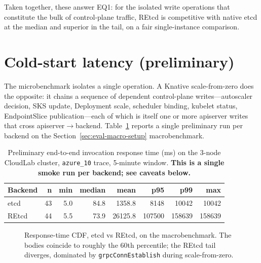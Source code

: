 Taken together, these answer EQ1: for the isolated write operations that constitute the bulk of control-plane traffic, REtcd is competitive with native etcd at the median and superior in the tail, on a fair single-instance comparison.

\section{Cold-start latency (preliminary)}
\label{sec:eval-coldstart}

The microbenchmark isolates a single operation. A Knative scale-from-zero does the opposite: it chains a sequence of dependent control-plane writes---autoscaler decision, SKS update, Deployment scale, scheduler binding, kubelet status, EndpointSlice publication---each of which is itself one or more apiserver writes that cross apiserver$\rightarrow$backend. Table~\ref{tab:eval-coldstart} reports a single preliminary run per backend on the Section~\ref{sec:eval-macro-setup} macrobenchmark.

\begin{table}[h]
    \centering
    \caption{Preliminary end-to-end invocation response time (ms) on the 3-node CloudLab cluster, \texttt{azure\_10} trace, 5-minute window. \textbf{This is a single smoke run per backend; see caveats below.}}
    \label{tab:eval-coldstart}
    \begin{tabular}{@{}lrrrrrrr@{}}
        \toprule
        \textbf{Backend} & \textbf{n} & \textbf{min} & \textbf{median} & \textbf{mean} & \textbf{p95} & \textbf{p99} & \textbf{max} \\
        \midrule
        etcd  & 43 & 5.0 & 84.8 &  1358.8 &   8148 &  10042 &  10042 \\
        REtcd & 44 & 5.5 & 73.9 & 26125.8 & 107500 & 158639 & 158639 \\
        \bottomrule
    \end{tabular}
\end{table}

\begin{figure}[h]
    \centering
    \caption{Response-time CDF, etcd vs REtcd, on the macrobenchmark. The bodies coincide to roughly the 60th percentile; the REtcd tail diverges, dominated by \texttt{grpcConnEstablish} during scale-from-zero.}
    \label{fig:eval-coldstart-cdf}
\end{figure}

